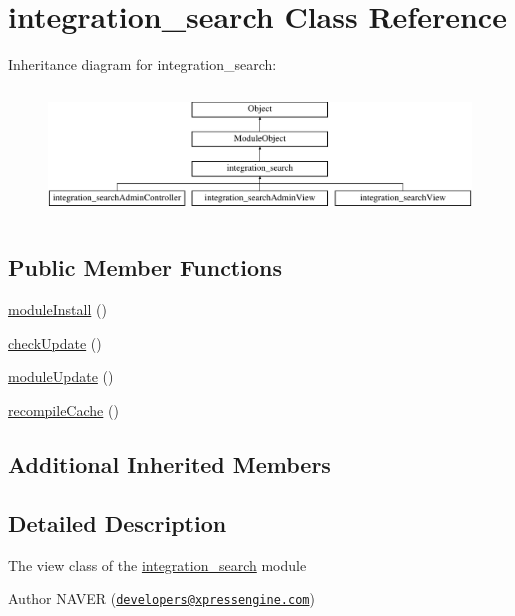\hypertarget{classintegration__search}{\section{integration\-\_\-search Class Reference}
\label{classintegration__search}
}
Inheritance diagram for integration\-\_\-search\-:\begin{figure}[H]
\begin{center}
\leavevmode
\includegraphics[height=3.456790cm]{classintegration__search}
\end{center}
\end{figure}
\subsection*{Public Member Functions}
\begin{DoxyCompactItemize}
\item 
\hyperlink{classintegration__search_a04d168bf88a4f95b6f4bd24854538d87}{module\-Install} ()
\item 
\hyperlink{classintegration__search_a998b55202e7ea75389e2ab8f640b374d}{check\-Update} ()
\item 
\hyperlink{classintegration__search_a4a0b59c788e9240fada3131b35ef273c}{module\-Update} ()
\item 
\hyperlink{classintegration__search_aaa47663580bb0ec22cf7b419ad47f2af}{recompile\-Cache} ()
\end{DoxyCompactItemize}
\subsection*{Additional Inherited Members}


\subsection{Detailed Description}
The view class of the \hyperlink{classintegration__search}{integration\-\_\-search} module

\begin{DoxyAuthor}{Author}
N\-A\-V\-E\-R (\href{mailto:developers@xpressengine.com}{\tt developers@xpressengine.\-com}) 
\end{DoxyAuthor}


